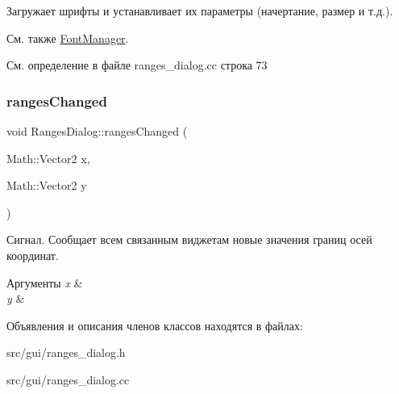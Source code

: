 Загружает шрифты и устанавливает их параметры (начертание, размер и т.\+д.). 

\begin{DoxySeeAlso}{См. также}
\hyperlink{class_font_manager}{Font\+Manager}. 
\end{DoxySeeAlso}


См. определение в файле ranges\+\_\+dialog.\+cc строка 73

\hypertarget{class_ranges_dialog_a8d4fb1f4d8bd2e5e3d0bc36f390e4974}{}\label{class_ranges_dialog_a8d4fb1f4d8bd2e5e3d0bc36f390e4974} 
\subsubsection{\texorpdfstring{ranges\+Changed}{rangesChanged}}
{\footnotesize\ttfamily void Ranges\+Dialog\+::ranges\+Changed (\begin{DoxyParamCaption}\item[{Math\+::\+Vector2}]{x,  }\item[{Math\+::\+Vector2}]{y }\end{DoxyParamCaption})\hspace{0.3cm}{\ttfamily [signal]}}



Сигнал. Сообщает всем связанным виджетам новые значения границ осей координат. 


\begin{DoxyParams}{Аргументы}
{\em x} & \\
\hline
{\em y} & \\
\hline
\end{DoxyParams}


Объявления и описания членов классов находятся в файлах\+:\begin{DoxyCompactItemize}
\item 
src/gui/ranges\+\_\+dialog.\+h\item 
src/gui/ranges\+\_\+dialog.\+cc\end{DoxyCompactItemize}
